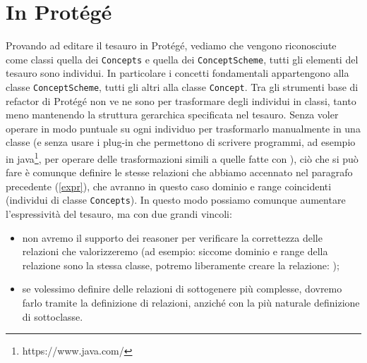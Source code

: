 \section{In Protégé}
Provando ad editare il tesauro in Protégé, vediamo che vengono riconosciute come classi quella dei \verb|Concepts| e quella dei \verb|ConceptScheme|, tutti gli elementi del tesauro sono individui. In particolare i concetti fondamentali appartengono alla classe \verb|ConceptScheme|, tutti gli altri alla classe \verb|Concept|. Tra gli strumenti base di refactor di Protégé non ve ne sono per trasformare degli individui in classi, tanto meno mantenendo la struttura gerarchica specificata nel tesauro. Senza voler operare in modo puntuale su ogni individuo per trasformarlo manualmente in una classe (e senza usare i plug-in che permettono di scrivere programmi, ad esempio in java\footnote{https://www.java.com/}, per operare delle trasformazioni simili a quelle fatte con \cduce), ciò che si può fare è comunque definire le stesse relazioni che abbiamo accennato nel paragrafo precedente (\ref{expr}), che avranno in questo caso dominio e range coincidenti (individui di classe \verb|Concepts|). In questo modo possiamo comunque aumentare l'espressività del tesauro, ma con due grandi vincoli:
\begin{itemize}
	\item non avremo il supporto dei reasoner per verificare la correttezza delle relazioni che valorizzeremo (ad esempio: siccome dominio e range della relazione  sono la stessa classe, potremo liberamente creare la relazione: );
	\item se volessimo definire delle relazioni di sottogenere più complesse, dovremo farlo tramite la definizione di relazioni, anziché con la più naturale definizione di sottoclasse.
\end{itemize}
